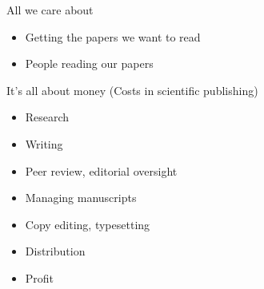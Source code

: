 \documentclass[12pt]{beamer}
\newcommand{\bi}{\begin{itemize}}
\newcommand{\ei}{\end{itemize}}
\newcommand{\subt}[1]{{\footnotesize \color{subtitle} {#1}}}
\begin{document}
\begin{frame}{All {\color{hilight} we} care about}

\bi
\itemsep12pt
\item Getting the papers {\color{hilight} we} want to read
\item People reading {\color{hilight} our} papers
\ei
\end{frame}


\begin{frame}[t]{It's all about money}
\subt{(Costs in scientific publishing)}

\vspace{36pt}

\bi
\item {\color<3>{hilight} \color<4>{gray} Research}
\item {\color<3>{hilight}  Writing}
\item {\color<3>{hilight}  Peer review, editorial oversight}
\item { \color<4>{hilight} Managing manuscripts}
\item { \color<4>{hilight} Copy editing, typesetting}
\item { \color<4>{hilight} Distribution}
\item<2-> {  \color<4>{hilight} Profit}
\ei
\end{frame}
\end{document}
